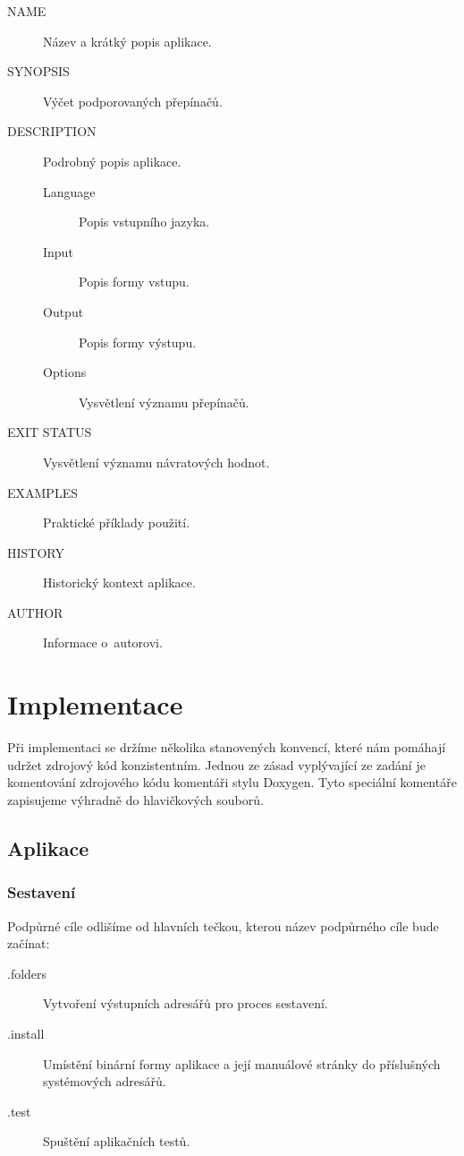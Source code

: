 \documentclass[thesis=B,czech,hidelinks]{FITthesis}[2012/06/26]
\begin{document}
\begin{description}
	\item[NAME]  Název a krátký popis aplikace.
	\item[SYNOPSIS] Výčet podporovaných přepínačů.
	\item[DESCRIPTION] Podrobný popis aplikace.
	\begin{description}
		\item[Language] Popis vstupního jazyka.
		\item[Input] Popis formy vstupu.
		\item[Output] Popis formy výstupu.
		\item[Options] Vysvětlení významu přepínačů.
	\end{description}
	\item[EXIT STATUS] Vysvětlení významu návratových hodnot.
	\item[EXAMPLES] Praktické příklady použití.
	\item[HISTORY] Historický kontext aplikace.
	\item[AUTHOR] Informace o~autorovi.
\end{description}

%
%
%

\chapter{Implementace}

Při implementaci se držíme několika stanovených konvencí, které nám pomáhají udržet zdrojový kód konzistentním. Jednou ze zásad vyplývající ze zadání je komentování zdrojového kódu komentáři stylu Doxygen. Tyto speciální komentáře zapisujeme výhradně do hlavičkových souborů.

\section{Aplikace}

\subsection{Sestavení}

Podpůrné cíle odlišíme od hlavních tečkou, kterou název podpůrného cíle bude začínat:

\begin{description}
	\item[.folders] Vytvoření výstupních adresářů pro proces sestavení.
	\item[.install] Umístění binární formy aplikace a její manuálové stránky do příslušných systémových adresářů.
	\item[.test] Spuštění aplikačních testů.
\end{description}
\end{document}
